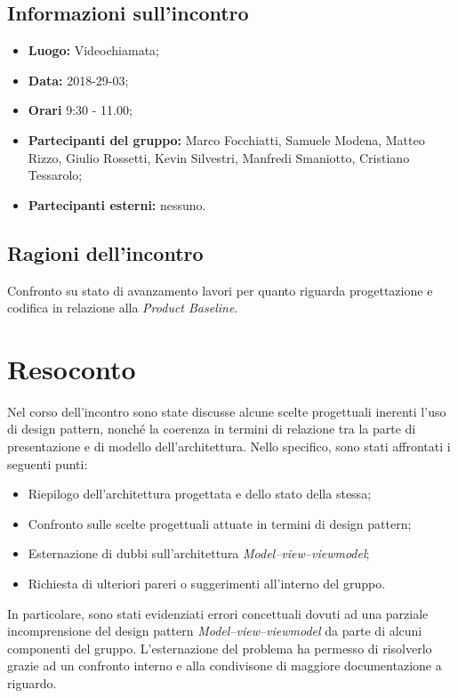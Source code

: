 \documentclass[openany,12pt,a4paper]{article}
\begin{document}
  \subsection{Informazioni sull'incontro} 
   
  \begin{itemize}  
      \item \textbf{Luogo:} Videochiamata;
      \item \textbf{Data:} 2018-29-03; 
      \item \textbf{Orari} 9:30 - 11.00;
      \item \textbf{Partecipanti del gruppo:} Marco Focchiatti, Samuele Modena, Matteo Rizzo, Giulio Rossetti, Kevin Silvestri, Manfredi Smaniotto, Cristiano Tessarolo; 
      \item \textbf{Partecipanti esterni:} nessuno. 
  \end{itemize} 
 
  \subsection{Ragioni dell'incontro} 
  Confronto su stato di avanzamento lavori per quanto riguarda progettazione e codifica in relazione alla \textit{Product Baseline}.
 
  \section{Resoconto} 
  Nel corso dell'incontro sono state discusse alcune scelte progettuali inerenti l'uso di design pattern, nonché la coerenza in termini di relazione tra la parte di presentazione e di modello dell'architettura. Nello specifico, sono stati affrontati i seguenti punti:
	
  \begin{itemize}
	\item Riepilogo dell'architettura progettata e dello stato della stessa;
	\item Confronto sulle scelte progettuali attuate in termini di design pattern;
	\item Esternazione di dubbi sull'architettura \textit{Model–view–viewmodel};
	\item Richiesta di ulteriori pareri o suggerimenti all'interno del gruppo.
  \end{itemize}

  In particolare, sono stati evidenziati errori concettuali dovuti ad una parziale incomprensione del design pattern \textit{Model–view–viewmodel} da parte di alcuni componenti del gruppo. L'esternazione del problema ha permesso di risolverlo grazie ad un confronto interno e alla condivisone di maggiore documentazione a riguardo. 
 
\end{document}
